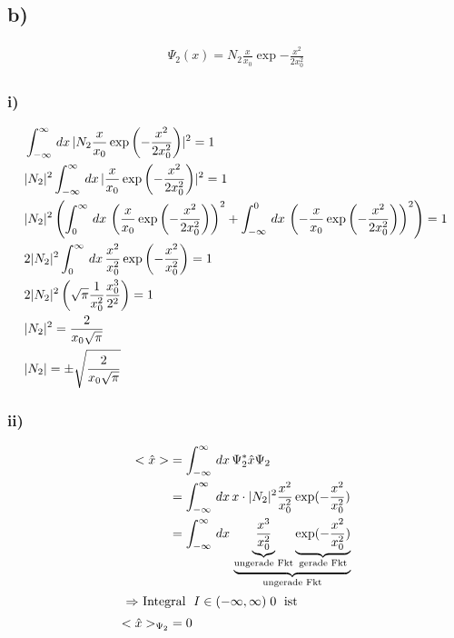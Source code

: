 \subsection{b)}

\begin{align}
    \Psi_2 (x)=N_2 \frac{x}{x_0} \exp{-\frac{x^2}{2x_0^2}}
\end{align}

\subsubsection{i)}

\begin{align}
    &\int_{-\infty}^{\infty}\,dx\, \lvert N_2\frac{x}{x_0}\exp\left(-\frac{x^2}{2x_0^2}\right)\rvert^2=1\\
    &\lvert N_2\rvert^2 \int_{-\infty}^{\infty}\,dx\, \lvert\frac{x}{x_0}\exp\left(-\frac{x^2}{2x_0^2}\right)\rvert^2=1\\
    &\lvert N_2\rvert^2 \left(\int_0^{\infty}\,dx\,\left(\frac{x}{x_0}\exp\left(-\frac{x^2}{2x_0^2}\right)\right)^2+ \int_{-\infty}^0\,dx\,\left(-\frac{x}{x_0} \exp\left(-\frac{x^2}{2x_0^2}\right)\right)^2 \right)=1\\
    &2 \lvert N_2\rvert^2 \int_0^{\infty}\,dx\, \frac{x^2}{x_0^2} \exp\left(-\frac{x^2}{x_0^2}\right)=1\\
    &2 \lvert N_2\rvert^2 \left(\sqrt{\pi} \frac{1}{x_0^2} \frac{x_0^3}{2^2}\right)=1\\
    &\lvert N_2\rvert^2=\frac{2}{x_0\sqrt{\pi}}\\
    &\lvert N_2\rvert= \pm \sqrt{\frac{2}{x_0\sqrt{\pi}}}
\end{align}

\subsubsection{ii)}

\begin{align}
    <\hat x > &= \int_{-\infty}^{\infty}\,dx\, \Psi _2^* \hat x \Psi _2\\
    &= \int_{-\infty}^{\infty}\,dx\, x\cdot  \lvert N_2\rvert^2 \frac{x^2}{x_0^2}\exp(-\frac{x^2}{x_0^2})\\
    &=\int_{-\infty}^{\infty}\,dx\, \underbrace{\underbrace{\frac{x^3}{x_0^2}}_{\text{ungerade Fkt}} \underbrace{\exp(-\frac{x^2}{x_0^2})}_{\text{gerade Fkt}}}_{\text{ungerade Fkt}}\\
    \intertext{
        $\Rightarrow $ Integral $\;I \in (-\infty,\infty) \; 0\; $ ist
    }
    <\hat x >_{\Psi_2}&=0
\end{align}

